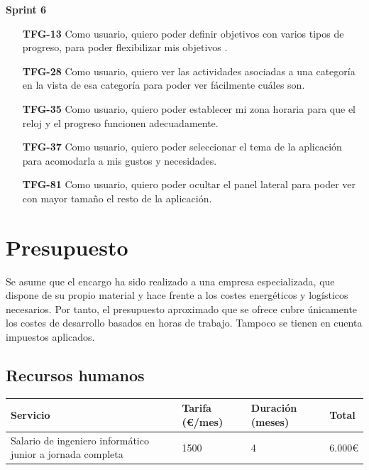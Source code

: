 \documentclass[10pt, a4paper]{aqademic}
\begin{document}
\textbf{Sprint 6}
\begin{itemize}[leftmargin=16mm]
	\item [\textbf{TFG-13}] Como usuario, quiero poder definir objetivos con varios tipos de progreso, para poder flexibilizar mis objetivos .
	
	\item [\textbf{TFG-28}] Como usuario, quiero ver las actividades asociadas a una categoría en la vista de esa categoría para poder ver fácilmente cuáles son.
	
	\item [\textbf{TFG-35}] Como usuario, quiero poder establecer mi zona horaria para que el reloj y el progreso funcionen adecuadamente.
	
	\item [\textbf{TFG-37}] Como usuario, quiero poder seleccionar el tema de la aplicación para acomodarla a mis gustos y necesidades.
	
	\item [\textbf{TFG-81}] Como usuario, quiero poder ocultar el panel lateral para poder ver con mayor tamaño el resto de la aplicación.
\end{itemize}


\section{Presupuesto}

Se asume que el encargo ha sido realizado a una empresa especializada, que dispone de su propio material y 
hace frente a los costes energéticos y logísticos necesarios. Por tanto, el presupuesto aproximado que se ofrece cubre únicamente los costes
de desarrollo basados en horas de trabajo. Tampoco se tienen en cuenta impuestos aplicados.

\subsection*{Recursos humanos}

\begin{table}[h!]
	\begin{center}
		\begin{tabular}{|l|l|l|l|}
			\hline
			\rowcolor[HTML]{EFEFEF} 
			\textbf{Servicio}                   & \textbf{Tarifa (€/mes)} & \textbf{Duración (meses)} & \textbf{Total}              \\ \hline
			Salario de ingeniero informático junior a jornada completa & 1500       & 4          & \multicolumn{1}{r|}{6.000€} \\ \hline
		\end{tabular}
	\end{center}
\end{table}
\end{document}
